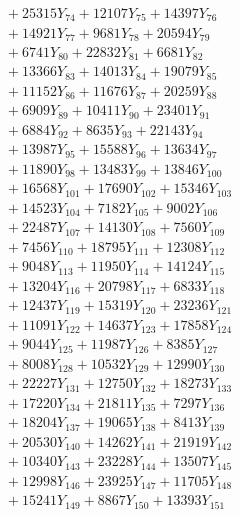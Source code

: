 \documentclass[a4paper,10pt]{article}
\begin{document}
{\begin{align}
&\;  + 25315 Y_{74} + 12107 Y_{75} + 14397 Y_{76} \\[0.3ex]
&\;  + 14921 Y_{77} + 9681 Y_{78} + 20594 Y_{79} \\[0.3ex]
&\;  + 6741 Y_{80} + 22832 Y_{81} + 6681 Y_{82} \\[0.3ex]
&\;  + 13366 Y_{83} + 14013 Y_{84} + 19079 Y_{85} \\[0.3ex]
&\;  + 11152 Y_{86} + 11676 Y_{87} + 20259 Y_{88} \\[0.5ex]\allowbreak
&\;  + 6909 Y_{89} + 10411 Y_{90} + 23401 Y_{91} \\[0.3ex]
&\;  + 6884 Y_{92} + 8635 Y_{93} + 22143 Y_{94} \\[0.3ex]
&\;  + 13987 Y_{95} + 15588 Y_{96} + 13634 Y_{97} \\[0.3ex]
&\;  + 11890 Y_{98} + 13483 Y_{99} + 13846 Y_{100} \\[0.3ex]
&\;  + 16568 Y_{101} + 17690 Y_{102} + 15346 Y_{103} \\[0.3ex]
&\;  + 14523 Y_{104} + 7182 Y_{105} + 9002 Y_{106} \\[0.3ex]
&\;  + 22487 Y_{107} + 14130 Y_{108} + 7560 Y_{109} \\[0.3ex]
&\;  + 7456 Y_{110} + 18795 Y_{111} + 12308 Y_{112} \\[0.3ex]
&\;  + 9048 Y_{113} + 11950 Y_{114} + 14124 Y_{115} \\[0.3ex]
&\;  + 13204 Y_{116} + 20798 Y_{117} + 6833 Y_{118} \\[0.5ex]\allowbreak
&\;  + 12437 Y_{119} + 15319 Y_{120} + 23236 Y_{121} \\[0.3ex]
&\;  + 11091 Y_{122} + 14637 Y_{123} + 17858 Y_{124} \\[0.3ex]
&\;  + 9044 Y_{125} + 11987 Y_{126} + 8385 Y_{127} \\[0.3ex]
&\;  + 8008 Y_{128} + 10532 Y_{129} + 12990 Y_{130} \\[0.3ex]
&\;  + 22227 Y_{131} + 12750 Y_{132} + 18273 Y_{133} \\[0.3ex]
&\;  + 17220 Y_{134} + 21811 Y_{135} + 7297 Y_{136} \\[0.3ex]
&\;  + 18204 Y_{137} + 19065 Y_{138} + 8413 Y_{139} \\[0.3ex]
&\;  + 20530 Y_{140} + 14262 Y_{141} + 21919 Y_{142} \\[0.3ex]
&\;  + 10340 Y_{143} + 23228 Y_{144} + 13507 Y_{145} \\[0.3ex]
&\;  + 12998 Y_{146} + 23925 Y_{147} + 11705 Y_{148} \\[0.5ex]\allowbreak
&\;  + 15241 Y_{149} + 8867 Y_{150} + 13393 Y_{151} \\[0.3ex]

\end{align}}
\end{document}
